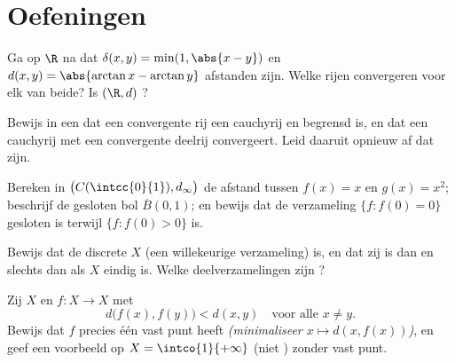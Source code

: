 \section{Oefeningen}

\begin{exercise}[$\star$]\label{exo:b2:metric:1}
Ga op $\R$ na dat $\delta(x, y) = \min(1, \abs{x - y})$ en $d(x,y)
= \abs{\arctan x - \arctan y}$ afstanden zijn. Welke rijen
convergeren voor elk van beide? Is $(\R, d)$ ?
\end{exercise}

\begin{exercise}[$\star$]\label{exo:b2:metric:2}
Bewijs in een  dat een convergente rij een
cauchyrij en begrensd is, en dat een cauchyrij met een convergente
deelrij convergeert. Leid daaruit opnieuw af dat   zijn.
\end{exercise}

\begin{exercise}[$\star$]\label{exo:b2:metric:3}
Bereken in $\bigl(C(\intcc{0}{1}), d_\infty\bigr)$ de afstand
tussen $f(x) = x$ en $g(x) = x^2$; beschrijf de gesloten bol
$\overline B(0, 1)$; en bewijs dat de verzameling $\{f : f(0) =
0\}$ gesloten is terwijl $\{f : f(0) > 0\}$  is.
\end{exercise}

\begin{exercise}[$\star\star$]\label{exo:b2:metric:4}
Bewijs dat de discrete  $X$ (een willekeurige
verzameling)  is, en dat zij  is dan en slechts dan
als $X$ eindig is. Welke deelverzamelingen zijn ?
\end{exercise}

\begin{exercise}[$\star\star$]\label{exo:b2:metric:5}
Zij $X$  en $f \colon X \to X$ met
\[
d\bigl(f(x), f(y)\bigr) < d(x, y) \quad \text{voor alle } x \neq y
.
\]
Bewijs dat $f$ precies één vast punt heeft \emph{(minimaliseer $x
\mapsto d(x, f(x))$)}, en geef een voorbeeld op $X =
\intco{1}{+\infty}$ (niet ) zonder vast punt.
\end{exercise}

